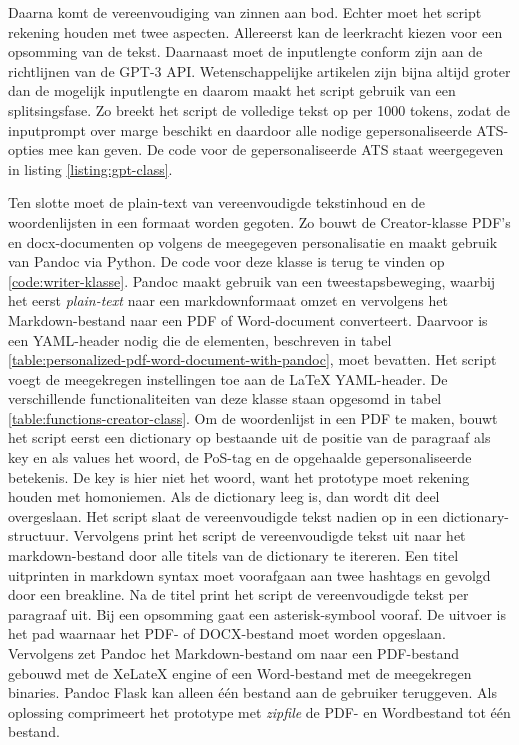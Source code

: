 Daarna komt de vereenvoudiging van zinnen aan bod. Echter moet het script rekening houden met twee aspecten. Allereerst kan de leerkracht kiezen voor een opsomming van de tekst. Daarnaast moet de inputlengte conform zijn aan de richtlijnen van de GPT-3 API. Wetenschappelijke artikelen zijn bijna altijd groter dan de mogelijk inputlengte en daarom maakt het script gebruik van een splitsingsfase. Zo breekt het script de volledige tekst op per 1000 tokens, zodat de inputprompt over marge beschikt en daardoor alle nodige gepersonaliseerde ATS-opties mee kan geven. De code voor de gepersonaliseerde ATS staat weergegeven in listing \ref{listing:gpt-class}. 

\medspace

Ten slotte moet de plain-text van vereenvoudigde tekstinhoud en de woordenlijsten in een formaat worden gegoten. Zo bouwt de Creator-klasse PDF's en docx-documenten op volgens de meegegeven personalisatie en maakt gebruik van Pandoc via Python. De code voor deze klasse is terug te vinden op \ref{code:writer-klasse}. Pandoc maakt gebruik van een tweestapsbeweging, waarbij het eerst \textit{plain-text} naar een markdownformaat omzet en vervolgens het Markdown-bestand naar een PDF of Word-document converteert. Daarvoor is een YAML-header nodig die de elementen, beschreven in tabel \ref{table:personalized-pdf-word-document-with-pandoc}, moet bevatten. Het script voegt de meegekregen instellingen toe aan de LaTeX YAML-header. De verschillende functionaliteiten van deze klasse staan opgesomd in tabel \ref{table:functions-creator-class}. Om de woordenlijst in een PDF te maken, bouwt het script eerst een dictionary op bestaande uit de positie van de paragraaf als key en als values het woord, de PoS-tag en de opgehaalde gepersonaliseerde betekenis. De key is hier niet het woord, want het prototype moet rekening houden met homoniemen. Als de dictionary leeg is, dan wordt dit deel overgeslaan. Het script slaat de vereenvoudigde tekst nadien op in een dictionary-structuur. Vervolgens print het script de vereenvoudigde tekst uit naar het markdown-bestand door alle titels van de dictionary te itereren. Een titel uitprinten in markdown syntax moet voorafgaan aan twee hashtags en gevolgd door een breakline. Na de titel print het script de vereenvoudigde tekst per paragraaf uit. Bij een opsomming gaat een asterisk-symbool vooraf. De uitvoer is het pad waarnaar het PDF- of DOCX-bestand moet worden opgeslaan. Vervolgens zet Pandoc het Markdown-bestand om naar een PDF-bestand gebouwd met de XeLateX engine of een Word-bestand met de meegekregen binaries. Pandoc Flask kan alleen één bestand aan de gebruiker teruggeven. Als oplossing comprimeert het prototype met \textit{zipfile} de PDF- en Wordbestand tot één bestand.

